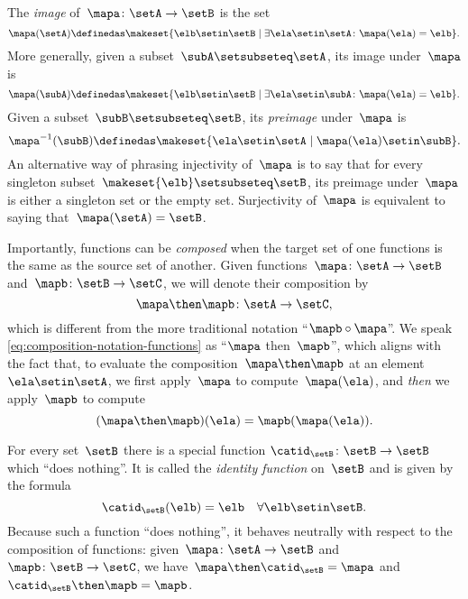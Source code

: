 The \emph{image} of~$\mapa\colon \setA \to \setB$ is the set
\begin{equation*}
    \mapa(\setA) \definedas \makeset{ \elb \setin\setB \mid \exists \ela \setin\setA \colon \mapa(\ela) = \elb }.
\end{equation*}
More generally, given a subset~$\subA \setsubseteq \setA$, its image under~$\mapa$ is
\begin{equation*}
    \mapa(\subA) \definedas \makeset{ \elb \setin\setB \mid \exists \ela \setin\subA \colon \mapa(\ela) = \elb }.
\end{equation*}
Given a subset~$\subB \setsubseteq \setB$, its \emph{preimage} under~$\mapa$ is
\begin{equation*}
    \mapa^{-1}(\subB) \definedas \makeset{ \ela \setin\setA \mid  \mapa(\ela) \setin\subB }.
\end{equation*}
An alternative way of phrasing injectivity of~$\mapa$ is to say that for every singleton subset~$\makeset{ \elb } \setsubseteq \setB$, its preimage under~$\mapa$ is either a singleton set or the empty set.
Surjectivity of~$\mapa$ is equivalent to saying that~$\mapa(\setA) = \setB$.

Importantly, functions can be \emph{composed} when the target set of one functions is the same as the source set of another.
Given functions~$\mapa\colon \setA \to \setB$ and~$\mapb \colon \setB \to \setC$, we will denote their composition by
\begin{equation}
    \label{eq:composition-notation-functions}
    \mapa \then \mapb \colon \setA \to \setC,
\end{equation}
which is different from the more traditional notation ``$\mapb \circ \mapa$''.
We speak \cref{eq:composition-notation-functions} as ``$\mapa$ then~$\mapb$'', which aligns with the fact that, to evaluate the composition~$\mapa \then \mapb$ at an element~$\ela \setin\setA$, we first apply~$\mapa$ to compute~$\mapa(\ela)$, and \emph{then} we apply~$\mapb$ to compute
\begin{equation*}
    (\mapa \then \mapb)(\ela) = \mapb(\mapa(\ela)).
\end{equation*}

For every set~$\setB$ there is a special function $\catid_\setB \colon \setB \to \setB$ which ``does nothing''.
It is called the \emph{identity function} on~$\setB$ and is given by the formula
\begin{equation*}
    \catid_\setB(\elb) = \elb \quad \forall  \elb \setin\setB.
\end{equation*}
Because such a function ``does nothing'', it behaves neutrally with respect to the composition of functions: given~$\mapa \colon \setA \to \setB$ and~$\mapb \colon \setB \to \setC$, we have~$\mapa \then \catid_\setB = \mapa$ and~$\catid_\setB \then \mapb = \mapb$.

